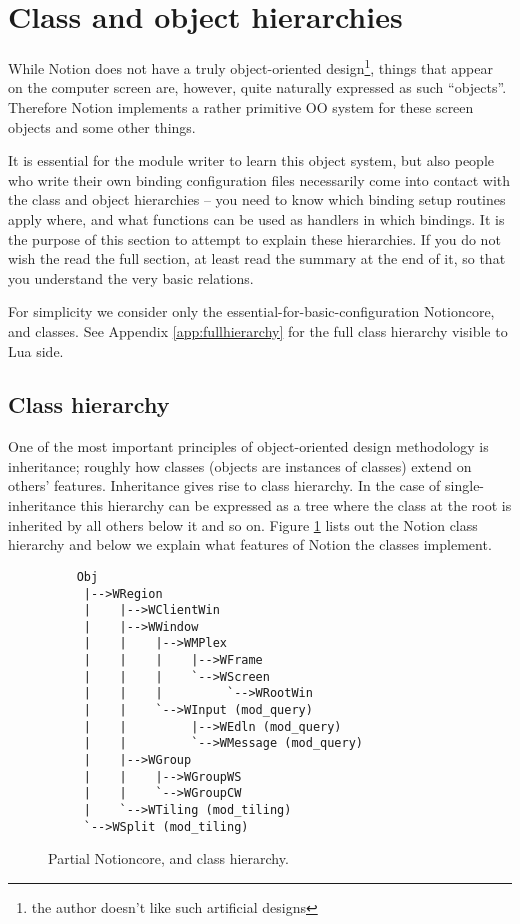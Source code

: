 
\section{Class and object hierarchies}
\label{sec:objects}

While Notion does not have a truly object-oriented design\footnote{the 
author doesn't like such artificial designs},
things that appear on the computer screen are, however, quite
naturally expressed as such ``objects''. Therefore Notion implements
a rather primitive OO system for these screen objects and some
other things. 

It is essential for the module writer to learn this object
system, but also people who write their own binding configuration files
necessarily come into contact with the class and object hierarchies
-- you need to know which binding setup routines apply where, 
and what functions can be used as handlers in which bindings.
It is the purpose of this section to attempt to explain these 
hierarchies. If you do not wish the read the full section, at least
read the summary at the end of it, so that you understand the very
basic relations.

For simplicity we consider only the essential-for-basic-configuration
Notioncore,  and  classes. 
See Appendix \ref{app:fullhierarchy} for the full class hierarchy visible
to Lua side.

\subsection{Class hierarchy}

One of the most important principles of object-oriented design methodology
is inheritance; roughly how classes (objects are instances of classes)
extend on others' features. Inheritance gives rise to class hierarchy.
In the case of single-inheritance this hierarchy can be expressed as a
tree where the class at the root is inherited by all others below it
and so on. Figure \ref{fig:classhierarchy} lists out the Notion class 
hierarchy and below we explain what features of Notion the classes 
implement.

\begin{figure}
\begin{htmlonly}
\docode %
\end{htmlonly}
\begin{verbatim}
    Obj
     |-->WRegion
     |    |-->WClientWin
     |    |-->WWindow
     |    |    |-->WMPlex
     |    |    |    |-->WFrame
     |    |    |    `-->WScreen
     |    |    |         `-->WRootWin
     |    |    `-->WInput (mod_query)
     |    |         |-->WEdln (mod_query)
     |    |         `-->WMessage (mod_query)
     |    |-->WGroup
     |    |    |-->WGroupWS
     |    |    `-->WGroupCW
     |    `-->WTiling (mod_tiling)
     `-->WSplit (mod_tiling)
\end{verbatim}
\caption{Partial Notioncore,  and  
    class hierarchy.}
\label{fig:classhierarchy}
\end{figure}

